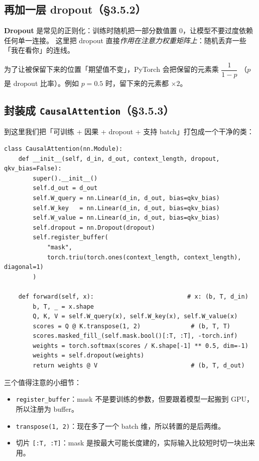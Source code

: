 \documentclass[11pt,a4paper]{ctexart}
\begin{document}
\subsection{再加一层 dropout（§3.5.2）}

\begin{intuitionblock}
\textbf{Dropout} 是常见的正则化：训练时随机把一部分数值置 0，让模型不要过度依赖任何单一连接。
这里把 dropout 直接\emph{作用在注意力权重矩阵上}：随机丢弃一些「我在看你」的连线。

为了让被保留下来的位置「期望值不变」，PyTorch 会把保留的元素乘 $\dfrac{1}{1-p}$
（$p$ 是 dropout 比率）。例如 $p = 0.5$ 时，留下来的元素都 $\times 2$。
\end{intuitionblock}

\subsection{封装成 \texttt{CausalAttention}（§3.5.3）}

到这里我们把「可训练 + 因果 + dropout + 支持 batch」打包成一个干净的类：

\begin{codebox}
\begin{lstlisting}
class CausalAttention(nn.Module):
    def __init__(self, d_in, d_out, context_length, dropout, qkv_bias=False):
        super().__init__()
        self.d_out = d_out
        self.W_query = nn.Linear(d_in, d_out, bias=qkv_bias)
        self.W_key   = nn.Linear(d_in, d_out, bias=qkv_bias)
        self.W_value = nn.Linear(d_in, d_out, bias=qkv_bias)
        self.dropout = nn.Dropout(dropout)
        self.register_buffer(
            "mask",
            torch.triu(torch.ones(context_length, context_length), diagonal=1)
        )

    def forward(self, x):                          # x: (b, T, d_in)
        b, T, _ = x.shape
        Q, K, V = self.W_query(x), self.W_key(x), self.W_value(x)
        scores = Q @ K.transpose(1, 2)              # (b, T, T)
        scores.masked_fill_(self.mask.bool()[:T, :T], -torch.inf)
        weights = torch.softmax(scores / K.shape[-1] ** 0.5, dim=-1)
        weights = self.dropout(weights)
        return weights @ V                          # (b, T, d_out)
\end{lstlisting}
\end{codebox}

三个值得注意的小细节：

\begin{itemize}
  \item \texttt{register\_buffer}：mask 不是要训练的参数，但要跟着模型一起搬到 GPU，所以注册为 buffer。
  \item \texttt{transpose(1, 2)}：现在多了一个 batch 维，所以转置的是后两维。
  \item 切片 \texttt{[:T, :T]}：mask 是按最大可能长度建的，实际输入比较短时切一块出来用。
\end{itemize}
\end{document}
